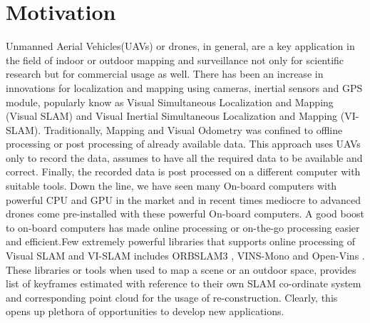 \section{Motivation}
\label{sec:intro:motivation}
Unmanned Aerial Vehicles(UAVs) or drones, in general, are a key application in the field of indoor or outdoor mapping and surveillance not only for scientific research but for commercial usage as well. There has been an increase in innovations for localization and mapping using cameras, inertial sensors and GPS module, popularly know as Visual Simultaneous Localization and Mapping (Visual SLAM) and Visual Inertial Simultaneous Localization and Mapping (VI-SLAM). Traditionally, Mapping and Visual Odometry was confined to offline processing or post processing of already available data. This approach uses UAVs only to record the data, assumes to have all the required data to be available and correct. Finally, the recorded data is post processed on a different computer with suitable tools. Down the line, we have seen many On-board computers with powerful CPU and GPU in the market and in recent times mediocre to advanced drones come pre-installed with these powerful On-board computers. A good boost to on-board computers has made online processing or on-the-go processing easier and efficient.Few extremely powerful libraries that supports online processing of Visual SLAM and VI-SLAM includes ORBSLAM3 \cite{ORBSLAM3_2020}, VINS-Mono \cite{qin2017vins} and Open-Vins \cite{Geneva2020ICRA}. These libraries or tools when used to map a scene or an outdoor space, provides list of keyframes estimated with reference to their own SLAM co-ordinate system and corresponding point cloud for the usage of re-construction. Clearly, this opens up plethora of opportunities to develop new applications.         

